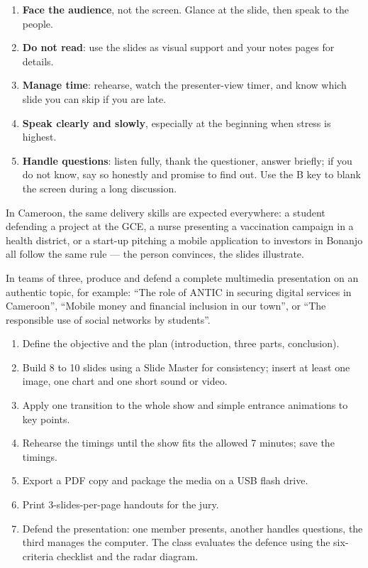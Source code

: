\documentclass[11pt]{article}
\newcommand{\cle}[1]{{\popxbold\color{popdark}#1}}
\newcounter{popsec}
\newcounter{popsub}
\newcommand{\courssub}[1]{%
  \stepcounter{popsub}%
  \par\vspace{9pt}\noindent{\popxbold\fontsize{11.5}{13}\selectfont\color{popink}{\color{poporange}\thepopsec.\thepopsub}\hspace{6pt}#1}\par\nopagebreak\vspace{4pt}
}
\begin{document}
\begin{methode}
\begin{enumerate}
\item \textbf{Face the audience}, not the screen. Glance at the slide, then speak to the people.
\item \textbf{Do not read}: use the slides as visual support and your notes pages for details.
\item \textbf{Manage time}: rehearse, watch the presenter-view timer, and know which slide you can skip if you are late.
\item \textbf{Speak clearly and slowly}, especially at the beginning when stress is highest.
\item \textbf{Handle questions}: listen fully, thank the questioner, answer briefly; if you do not know, say so honestly and promise to find out. Use the \cle{B} key to blank the screen during a long discussion.
\end{enumerate}
\end{methode}

\begin{savaistu}
In Cameroon, the same delivery skills are expected everywhere: a student defending a project at the GCE, a nurse presenting a vaccination campaign in a health district, or a start-up pitching a mobile application to investors in Bonanjo all follow the same rule --- the person convinces, the slides illustrate.
\end{savaistu}

\courssub{Integration Activity}

\begin{experience}
In teams of three, produce and defend a complete multimedia presentation on an authentic topic, for example: ``The role of ANTIC in securing digital services in Cameroon'', ``Mobile money and financial inclusion in our town'', or ``The responsible use of social networks by students''.
\begin{enumerate}
\item Define the objective and the plan (introduction, three parts, conclusion).
\item Build 8 to 10 slides using a Slide Master for consistency; insert at least one image, one chart and one short sound or video.
\item Apply one transition to the whole show and simple entrance animations to key points.
\item Rehearse the timings until the show fits the allowed 7 minutes; save the timings.
\item Export a PDF copy and package the media on a USB flash drive.
\item Print 3-slides-per-page handouts for the jury.
\item Defend the presentation: one member presents, another handles questions, the third manages the computer. The class evaluates the defence using the six-criteria checklist and the radar diagram.
\end{enumerate}
\end{experience}
\end{document}
